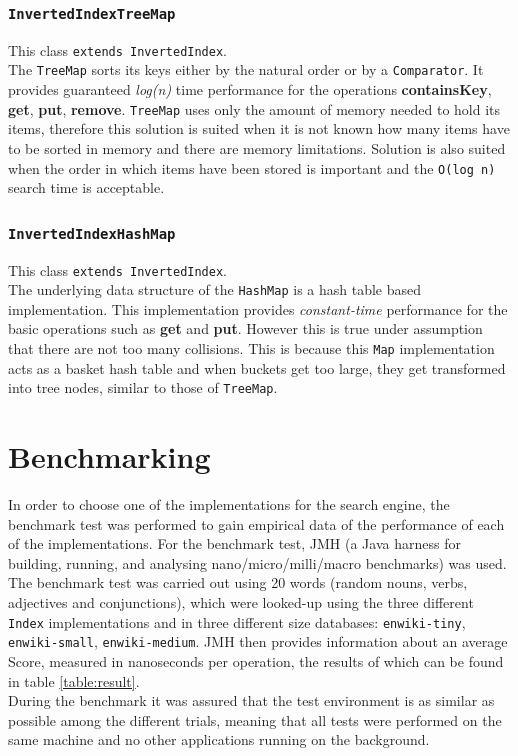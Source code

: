 \subsubsection{{\tt InvertedIndexTreeMap}}
This class {\tt extends InvertedIndex}.\\
The {\tt TreeMap} sorts its keys either by the natural order or by a {\tt Comparator}. It provides guaranteed \textit{log(n)} time performance for the operations \textbf{containsKey}, \textbf{get}, \textbf{put}, \textbf{remove}. \cite{oracle:treemap} {\tt TreeMap} uses only the amount of memory needed to hold its items, therefore this solution is suited when it is not known how many items have to be sorted in memory and there are memory limitations. Solution is also suited when the order in which items have been stored is important and the {\tt O(log n)} search time is acceptable.\cite{baeldung:HashTreeCompared}

\subsubsection{{\tt InvertedIndexHashMap}}
This class {\tt extends InvertedIndex}.\\
The underlying data structure of the {\tt HashMap} is a hash table based implementation. This implementation provides \textit{constant-time} performance for the basic operations such as \textbf{get} and \textbf{put}. \cite{oracle:hashmap} However this is true under assumption that there are not too many collisions. This is because this {\tt Map} implementation acts as a basket hash table and when buckets get too large, they get transformed into tree nodes, similar to those of {\tt TreeMap}. \cite{baeldung:HashTreeCompared}

\section{Benchmarking}
In order to choose one of the implementations for the search engine, the benchmark test was performed to gain empirical data of the performance of each of the implementations. For the benchmark test, JMH (a Java harness for building, running, and analysing nano/micro/milli/macro benchmarks) was used. \citep{OpenJDK:jmh} The benchmark test was carried out using 20 words (random nouns, verbs, adjectives and conjunctions), which were looked-up using the three different {\tt Index} implementations and in three different size databases: {\tt enwiki-tiny}, {\tt enwiki-small}, {\tt enwiki-medium}. JMH then provides information about an average Score, measured in nanoseconds per operation, the results of which can be found in table \ref{table:result}.\\
During the benchmark it was assured that the test environment is as similar as possible among the different trials, meaning that all tests were performed on the same machine and no other applications running on the background.

